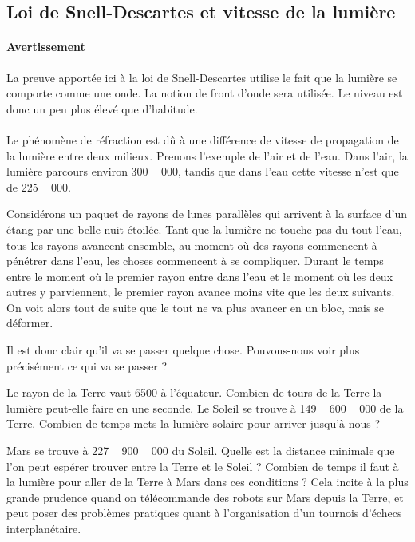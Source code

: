 \subsection{Loi de Snell-Descartes et vitesse de la lumière}   \label{SubsecSnellVitesse}

\paragraph{Avertissement}
La preuve apportée ici à la loi de Snell-Descartes utilise le fait que la lumière se comporte comme une onde. La notion de front d'onde sera utilisée. Le niveau est donc un peu plus élevé que d'habitude.

\paragraph{}

Le phénomène de réfraction est dû à une différence de vitesse de propagation de la lumière entre deux milieux. Prenons l'exemple de l'air et de l'eau. Dans l'air, la lumière parcours environ \unit{300\,000}{\kilo\meter\per\second}, tandis que dans l'eau cette vitesse n'est que de \unit{225\,000}{\kilo\meter\per\second}. 

Considérons un paquet de rayons de lunes parallèles qui arrivent à la surface d'un étang par une belle nuit étoilée. Tant que la lumière ne touche pas du tout l'eau, tous les rayons avancent ensemble, au moment où des rayons commencent à pénétrer dans l'eau, les choses commencent à se compliquer. Durant le temps entre le moment où le premier rayon entre dans l'eau et le moment où les deux autres y parviennent, le premier rayon avance moins vite que les deux suivants. On voit alors tout de suite que le tout ne va plus avancer en un bloc, mais se déformer.

Il est donc clair qu'il va se passer quelque chose. Pouvons-nous voir plus précisément ce qui va se passer ?

\begin{exercice}
Le rayon de la Terre vaut \unit{6500}{\kilo\meter} à l'équateur. Combien de tours de la Terre la lumière peut-elle faire en une seconde. Le Soleil se trouve à \unit{149\,600\,000}{\kilo\meter} de la Terre. Combien de temps mets la lumière solaire pour arriver jusqu'à nous ? 

Mars se trouve à \unit{227\,900\,000}{\kilo\meter} du Soleil. Quelle est la distance minimale que l'on peut espérer trouver entre la Terre et le Soleil ? Combien de temps il faut à la lumière pour aller de la Terre à Mars dans ces conditions ? Cela incite à la plus grande prudence quand on télécommande des robots sur Mars depuis la Terre, et peut poser des problèmes pratiques quant à l'organisation d'un tournois d'échecs interplanétaire.
\end{exercice}


